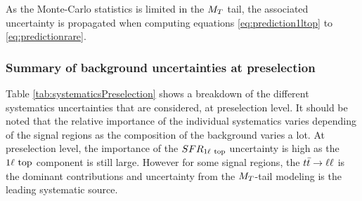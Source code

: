             As the Monte-Carlo statistics is limited in the $M_T$ tail, the associated uncertainty
            is propagated when computing equations \ref{eq:prediction1ltop} to \ref{eq:predictionrare}.

            \subsubsection{Summary of background uncertainties at preselection}
           
            Table \ref{tab:systematicsPreselection} shows a breakdown of the different systematics
            uncertainties that are considered, at preselection level. It should be noted that the
            relative importance of the individual systematics varies depending of the signal regions
            as the composition of the background varies a lot. At preselection level, the importance
            of the $SFR_{1\ell~\text{top}}$ uncertainty is high as the $1\ell~\text{top}$ component is still large.
            However for some signal regions, the $t\bar{t} \rightarrow \ell \ell$ is the dominant contributions and
            uncertainty from the $M_T$-tail modeling is the leading systematic source.

